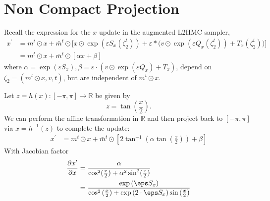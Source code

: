 \section{Non Compact Projection}%
\label{sec:ncp}
Recall the expression for the \(x\) update in the augmented L2HMC sampler,
%
\begin{align}
  x^{\prime} &= m^{t}\odot x + \bar{m}^{t}\odot\big[x\odot\exp(\varepsilon
           S_{x}(\zeta^{t}_{2})) + \varepsilon * \big(v \odot \exp(\varepsilon
           Q_x(\zeta^{t}_{2})) + T_{x}(\zeta^{t}_{2})\big)\big]\\
        &= m^{t}\odot x + \bar{m}^{t}\odot\left[\alpha x + \beta\right]
\end{align}
%
where \(\alpha = \exp(\varepsilon S_{x}), \beta =
\varepsilon\cdot\left(v\odot\exp(\varepsilon Q_{x}) + T_{x}\right)\), depend on
\(\zeta_{2} = (m^{t}\odot x, v, t)\), but are independent of \(\bar{m}^{t}\odot
x\).

Let \(z = h(x): [-\pi, \pi] \rightarrow \mathbb{R}\) be given by
%
\begin{equation}
  z = \tan\left(\frac{x}{2}\right).
\end{equation}
%
We can perform the affine transformation in \(\mathbb{R}\) and then project
back to \([-\pi, \pi]\) via \(x = h^{-1}(z)\) to complete the
update:
%
\begin{align}
  x^{\prime} &= m^{t}\odot x + \bar{m}^{t}\odot \left[2\tan^{-1}\left(\alpha
           \tan\left(\frac{x}{2}\right)\right) + \beta\right]
\end{align}
%
With Jacobian factor
%
\begin{align}
  \frac{\partial x^{\prime}}{\partial x} 
  &= \frac{\alpha}{\cos^{2}(\frac{x}{2})+\alpha^{2}\sin^{2}(\frac{x}{2})} \\
  &= \frac{\exp{(\eps S_{x})}}{\cos^{2}{(\frac{x}{2})} 
  + \exp{(2\cdot\eps S_{x})} \sin{(\frac{x}{2})}}
\end{align}
